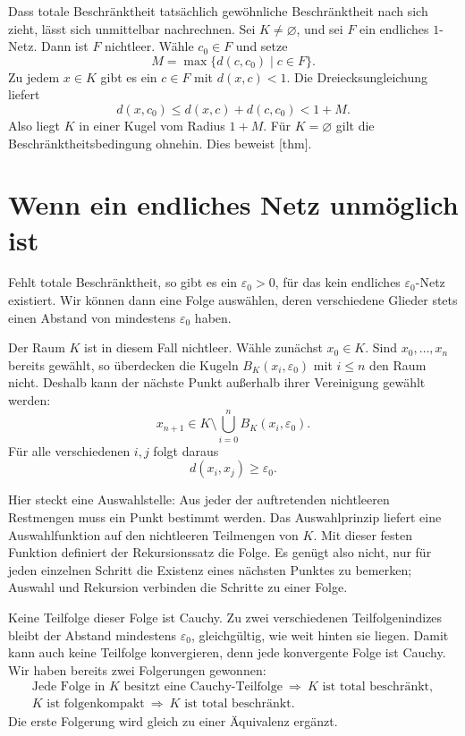 Dass totale Beschränktheit tatsächlich gewöhnliche Beschränktheit
nach sich zieht, lässt sich unmittelbar nachrechnen. Sei \(K\ne
\varnothing\), und sei \(F\) ein endliches \(1\)-Netz. Dann ist
\(F\) nichtleer. Wähle \(c_0\in F\) und setze
\[
 M=\max\{d(c,c_0)\mid c\in F\}.
\]
Zu jedem \(x\in K\) gibt es ein \(c\in F\) mit \(d(x,c)<1\).
Die Dreiecksungleichung liefert
\[
 d(x,c_0)\leq d(x,c)+d(c,c_0)<1+M.
\]
Also liegt \(K\) in einer Kugel vom Radius \(1+M\). Für
\(K=\varnothing\) gilt die Beschränktheitsbedingung ohnehin.
Dies beweist [thm].

\section*{Wenn ein endliches Netz unmöglich ist}

Fehlt totale Beschränktheit, so gibt es ein \(\varepsilon_0>0\),
für das kein endliches \(\varepsilon_0\)-Netz existiert. Wir können
dann eine Folge auswählen, deren verschiedene Glieder stets einen
Abstand von mindestens \(\varepsilon_0\) haben.

Der Raum \(K\) ist in diesem Fall nichtleer. Wähle zunächst
\(x_0\in K\). Sind \(x_0,\ldots,x_n\) bereits gewählt, so
überdecken die Kugeln \(B_K(x_i,\varepsilon_0)\) mit \(i\leq n\)
den Raum nicht. Deshalb kann der nächste Punkt außerhalb ihrer
Vereinigung gewählt werden:
\[
 x_{n+1}\in K\setminus
       \bigcup_{i=0}^{n}B_K(x_i,\varepsilon_0).
\]
Für alle verschiedenen \(i,j\) folgt daraus
\[
 d(x_i,x_j)\geq\varepsilon_0.
\]

Hier steckt eine Auswahlstelle: Aus jeder der auftretenden nichtleeren
Restmengen muss ein Punkt bestimmt werden. Das Auswahlprinzip liefert
eine Auswahlfunktion auf den nichtleeren Teilmengen von \(K\).
Mit dieser festen Funktion definiert der Rekursionssatz die Folge.
Es genügt also nicht, nur für jeden einzelnen Schritt die Existenz
eines nächsten Punktes zu bemerken; Auswahl und Rekursion verbinden
die Schritte zu einer Folge.

Keine Teilfolge dieser Folge ist Cauchy. Zu zwei verschiedenen
Teilfolgenindizes bleibt der Abstand mindestens
\(\varepsilon_0\), gleichgültig, wie weit hinten sie liegen.
Damit kann auch keine Teilfolge konvergieren, denn jede konvergente
Folge ist Cauchy. Wir haben bereits zwei Folgerungen gewonnen:
\[
 \begin{gathered}
 \text{Jede Folge in \(K\) besitzt eine Cauchy-Teilfolge}
       \ \Longrightarrow\ K\text{ ist total beschränkt},\\[.4em]
 K\text{ ist folgenkompakt}
       \ \Longrightarrow\ K\text{ ist total beschränkt}.
 \end{gathered}
\]
Die erste Folgerung wird gleich zu einer Äquivalenz ergänzt.

